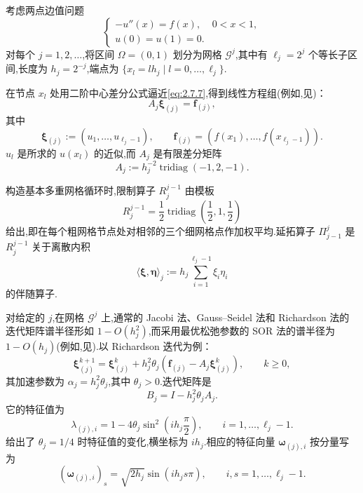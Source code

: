 \begin{example}\label{ex:2.7.2}
考虑两点边值问题
\begin{equation}\label{eq:2.7.7}
  \begin{cases}
    -u''(x)=f(x),&0<x<1,\\
    u(0)=u(1)=0.
  \end{cases}
\end{equation}
对每个 \(j=1,2,\ldots\),将区间 \(\Omega=(0,1)\) 划分为网格 \(\mathcal G^j\),其中有 \(\ell_j=2^j\) 个等长子区间,长度为 \(h_j=2^{-j}\),端点为 \(\{x_l=lh_j\mid l=0,\ldots,\ell_j\}\).

在节点 \(x_l\) 处用二阶中心差分公式逼近\eqref{eq:2.7.7},得到线性方程组(例如,见)：
\begin{equation}\label{eq:2.7.8}
  A_j\boldsymbol{\xi}_{(j)}=\boldsymbol{f}_{(j)},
\end{equation}
其中
\[
  \boldsymbol{\xi}_{(j)}:=(u_1,\ldots,u_{\ell_j-1}),\qquad
  \boldsymbol{f}_{(j)}=(f(x_1),\ldots,f(x_{\ell_j-1})).
\]
\(u_l\) 是所求的 \(u(x_l)\) 的近似,而 \(A_j\) 是有限差分矩阵
\[
  A_j:=h_j^{-2}\operatorname{tridiag}(-1,2,-1).
\]

构造基本多重网格循环时,限制算子 \(R_j^{j-1}\) 由模板
\[
  R_j^{j-1}=\frac12\operatorname{tridiag}\left(\frac12,1,\frac12\right)
\]
给出,即在每个粗网格节点处对相邻的三个细网格点作加权平均.延拓算子 \(\Pi_{j-1}^j\) 是 \(R_j^{j-1}\) 关于离散内积
\[
  \langle\boldsymbol{\xi},\boldsymbol{\eta}\rangle_j
  :=h_j\sum_{i=1}^{\ell_j-1}\xi_i\eta_i
\]
的伴随算子.

对给定的 \(j\),在网格 \(\mathcal G^j\) 上,通常的 Jacobi 法、Gauss--Seidel 法和 Richardson 法的迭代矩阵谱半径形如 \(1-O(h_j^2)\),而采用最优松弛参数的 SOR 法的谱半径为 \(1-O(h_j)\)(例如,见).以 Richardson 迭代为例：
\begin{equation}\label{eq:2.7.9}
  \boldsymbol{\xi}_{(j)}^{k+1}=\boldsymbol{\xi}_{(j)}^k+
    h_j^2\theta_j(\boldsymbol{f}_{(j)}-A_j\boldsymbol{\xi}_{(j)}^k),\qquad k\ge0,
\end{equation}
其加速参数为 \(\alpha_j=h_j^2\theta_j\),其中 \(\theta_j>0\).迭代矩阵是
\[
  B_j=I-h_j^2\theta_j A_j.
\]
它的特征值为
\begin{equation}\label{eq:2.7.10}
  \lambda_{(j),i}=1-4\theta_j\sin^2\left(ih_j\frac\pi2\right),
    \qquad i=1,\ldots,\ell_j-1.
\end{equation}
给出了 \(\theta_j=1/4\) 时特征值的变化,横坐标为 \(ih_j\).相应的特征向量 \(\boldsymbol{\omega}_{(j),i}\) 按分量写为
\begin{equation}\label{eq:2.7.11}
  (\boldsymbol{\omega}_{(j),i})_s=\sqrt{2h_j}\sin(ih_js\pi),
  \qquad i,s=1,\ldots,\ell_j-1.
\end{equation}


\end{example}
